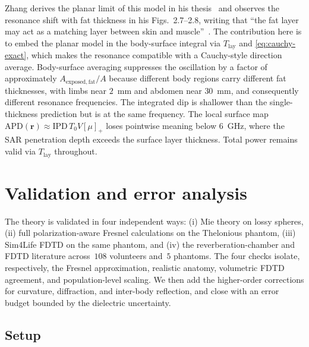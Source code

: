 \documentclass[journal,twocolumn,10pt]{IEEEtran}
\newcommand{\rr}{\mathbf{r}}
\newcommand{\IPD}{\mathrm{IPD}}
\newcommand{\APD}{\mathrm{APD}}
\newcommand{\Tlay}{T_{\mathrm{lay}}}
\newcommand{\pospart}[1]{\left[#1\right]_{+}}
\newcommand{\Vis}{V}
\begin{document}
Zhang derives the planar limit of this model in his
thesis~\cite[Sec.~2.2]{Zhang2017thesis} and observes the resonance
shift with fat thickness in his Figs.~2.7--2.8, writing that ``the
fat layer may act as a matching layer between skin and
muscle''~\cite[p.~21]{Zhang2017thesis}. The contribution here is to
embed the planar model in the body-surface integral via $\Tlay$ and
\eqref{eq:cauchy-exact}, which makes the resonance compatible with a
Cauchy-style direction average. Body-surface averaging suppresses
the oscillation by a factor of approximately
$A_{\mathrm{exposed,fat}}/A$ because different body regions carry
different fat thicknesses, with limbs near $2$~mm and abdomen near
$30$~mm, and consequently different resonance frequencies. The
integrated dip is shallower than the single-thickness prediction but
is at the same frequency. The local surface map
$\APD(\rr) \approx \IPD\,T_0 \Vis \pospart{\mu}$ loses pointwise
meaning below $6$~GHz, where the SAR penetration depth exceeds the
surface layer thickness. Total power remains valid via $\Tlay$
throughout.

\section{Validation and error analysis}\label{sec:val}

The theory is validated in four independent ways: (i) Mie theory on
lossy spheres, (ii) full polarization-aware Fresnel calculations on
the Thelonious phantom, (iii) Sim4Life FDTD on the same phantom, and
(iv) the reverberation-chamber and FDTD literature across~$108$
volunteers and~$5$ phantoms. The four checks isolate, respectively, the
Fresnel approximation, realistic anatomy, volumetric FDTD agreement,
and population-level scaling. We then add the higher-order corrections
for curvature, diffraction, and inter-body reflection, and close with an
error budget bounded by the dielectric uncertainty.

\subsection{Setup}\label{subsec:val-setup}
\end{document}
